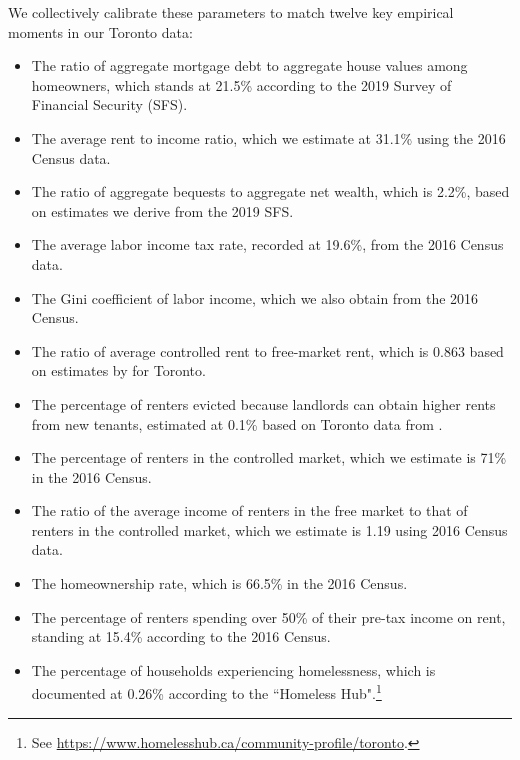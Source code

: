\documentclass[parskip=full]{article}
\begin{document}
We collectively calibrate these parameters to match twelve key empirical moments in our Toronto data:

\begin{itemize}
    \item The ratio of aggregate mortgage debt to aggregate house values among homeowners, which stands at 21.5\% according to the 2019 Survey of Financial Security (SFS).
    \item The average rent to income ratio, which we estimate at 31.1\% using the 2016 Census data.
    \item The ratio of aggregate bequests to aggregate net wealth, which is 2.2\%, based on estimates we derive from the 2019 SFS.
    \item The average labor income tax rate, recorded at 19.6\%, from the 2016 Census data.
    \item The Gini coefficient of labor income, which we also obtain from the 2016 Census.
    \item The ratio of average controlled rent to free-market rent, which is 0.863 based on estimates by \citet{zhang-gou} for Toronto.
    \item The percentage of renters evicted because landlords can obtain higher rents from new tenants, estimated at 0.1\% based on Toronto data from \citet{LeonIveniuk2020}.
    \item The percentage of renters in the controlled market, which we estimate is 71\% in the 2016 Census.
    \item The ratio of the average income of renters in the free market to that of renters in the controlled market, which we estimate is 1.19 using 2016 Census data. %
    \item The homeownership rate, which is 66.5\% in the 2016 Census.
    \item The percentage of renters spending over 50\% of their pre-tax income on rent, standing at 15.4\% according to the 2016 Census.
    \item The percentage of households experiencing homelessness, which is documented at 0.26\% according to the ``Homeless Hub".\footnote{See \url{https://www.homelesshub.ca/community-profile/toronto}.}
\end{itemize}
\end{document}
